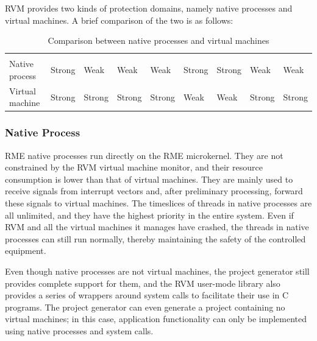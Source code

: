 RVM provides two kinds of protection domains, namely native processes and virtual machines. A brief comparison of the two is as follows:

\begin{xltabular}{\textwidth}{@{}>{\hsize\raggedright\arraybackslash}X*{8}{>{\hsize\centering\arraybackslash}X}@{}}
\caption{Comparison between native processes and virtual machines}\label{tab:2-2}\\
\toprule
\rule{0pt}{3.1cm} &  &  &  &  &  &  & 
& \tabularnewline
\endfirsthead
\toprule
\rule{0pt}{3.1cm} &  &  &  &  &  &  & 
& \tabularnewline
\midrule
\endhead
\bottomrule
\endlastfoot
Native process & Strong & Weak & Weak & Weak & Strong & Strong & Weak & Weak\tabularnewline
Virtual machine & Strong & Strong & Strong & Strong & Weak & Weak & Strong & Strong\tabularnewline
\end{xltabular}

\subsubsection{Native Process}\label{subsubsec:2-1-3-1}

RME native processes run directly on the RME microkernel. They are not constrained by the RVM virtual machine monitor, and their resource consumption is lower than that of virtual machines. They are mainly used to receive signals from interrupt vectors and, after preliminary processing, forward these signals to virtual machines. The timeslices of threads in native processes are all unlimited, and they have the highest priority in the entire system. Even if RVM and all the virtual machines it manages have crashed, the threads in native processes can still run normally, thereby maintaining the safety of the controlled equipment.

Even though native processes are not virtual machines, the project generator still provides complete support for them, and the RVM user-mode library also provides a series of wrappers around system calls to facilitate their use in C programs. The project generator can even generate a project containing no virtual machines; in this case, application functionality can only be implemented using native processes and system calls.

